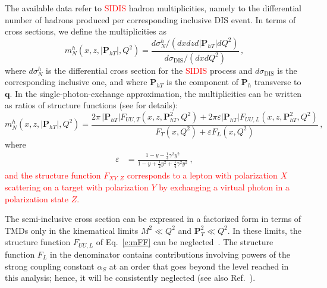 \documentclass[aps,preprintnumbers,showpacs,nofootinbib,superscriptaddress,floatfix]{revtex4}
\newcommand{\Tperp}{T}
\begin{document}
The available data refer to \textcolor{red}{SIDIS} hadron multiplicities, namely to the differential number of hadrons produced per corresponding inclusive DIS event. In terms of cross sections, we define the multiplicities as
\begin{equation}
m_N^h (x,z,|\bm{P}_{h\Tperp}|, Q^2) = \frac{d \sigma_N^h / ( dx  dz d|\bm{P}_{h\Tperp}| dQ^2) }
                                                                   {d\sigma_{\text{DIS}} / ( dx dQ^2 ) }\, ,
\label{e:multiplicity}
\end{equation}
where $d\sigma_N^h$ is the differential cross section for the \textcolor{red}{SIDIS} process and $d\sigma_{\text{DIS}}$ is the corresponding inclusive one, 
and where \( \bm{P}_{h\Tperp} \) is the component of \( \bm{P}_{h} \) transverse to \( \bm{q} \). 
In the single-photon-exchange approximation, the multiplicities can be written as ratios of
structure functions (see \cite{Bacchetta:2006tn} for details):
\begin{equation}
m_N^h (x,z,|\bm{P}_{h\Tperp}|, Q^2) =   
\frac{2 \pi\,|\bm{P}_{h\Tperp}| F_{UU ,T}(x,z,\bm{P}_{h\Tperp}^2, Q^2) + 2 \pi
  \varepsilon |\bm{P}_{h\Tperp}| F_{UU ,L}(x,z,\bm{P}_{h\Tperp}^2, Q^2)}
        {F_{T}(x,Q^2) + \varepsilon  F_{L}(x,Q^2)} \, ,
 \label{e:mFF}
\end{equation} 
where
\begin{align}
\varepsilon &= \frac{1-y -\frac{1}{4} \gamma^2 y^2}{1-y+\frac{1}{2} y^2 +\frac{1}{4} \gamma^2 y^2} \ ,
\end{align}  
\textcolor{red}{and the structure function $F_{XY,Z}$ corresponds to a lepton with polarization $X$ scattering on a target with polarization $Y$ by exchanging a virtual photon in a polarization state $Z$.}

The semi-inclusive cross section can be expressed in a factorized form in terms of TMDs only in the kinematical limits $M^2 \ll Q^2$ and $\bm{P}_T^2 \ll Q^2$. In these limits, the structure function $F_{UU,L}$ of Eq.~\eqref{e:mFF} can be neglected~\cite{Bacchetta:2008xw}. The structure function $F_L$ in the denominator contains contributions involving powers of the strong coupling constant $\alpha_S$ at an order that goes beyond the level reached in this analysis; hence, it will be consistently neglected (see also Ref.~\cite{Signori:2013mda}).
\end{document}
